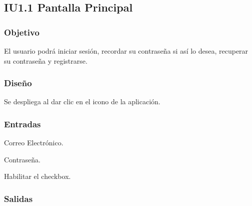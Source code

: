 \newpage
\subsection{IU1.1 Pantalla Principal}

\subsubsection{Objetivo}
	El usuario podrá iniciar sesión, recordar su contraseña si así lo desea, recuperar su contraseña y registrarse.  

\subsubsection{Diseño}
	Se despliega al dar clic en el icono de la aplicación.


\subsubsection{Entradas}
\begin{Citemize} 
	\item Correo Electrónico.
	\item Contraseña.
	\item Habilitar el checkbox.
\end{Citemize}

\subsubsection{Salidas}
\begin{Citemize}
	\item {}
	\item {}
	\item {}
	\item {}
\end{Citemize}